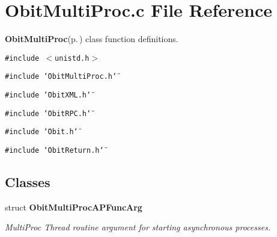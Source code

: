 \section{Obit\-Multi\-Proc.c File Reference}
\label{ObitMultiProc_8c}
{\bf Obit\-Multi\-Proc}{\rm (p.\,\pageref{structObitMultiProc})} class function definitions. 

{\tt \#include $<$unistd.h$>$}\par
{\tt \#include \char`\"{}Obit\-Multi\-Proc.h\char`\"{}}\par
{\tt \#include \char`\"{}Obit\-XML.h\char`\"{}}\par
{\tt \#include \char`\"{}Obit\-RPC.h\char`\"{}}\par
{\tt \#include \char`\"{}Obit.h\char`\"{}}\par
{\tt \#include \char`\"{}Obit\-Return.h\char`\"{}}\par
\subsection*{Classes}
\begin{CompactItemize}
\item 
struct {\bf Obit\-Multi\-Proc\-APFunc\-Arg}
\begin{CompactList}\small\item\em Multi\-Proc Thread routine argument for starting asynchronous processes. \item\end{CompactList}\end{CompactItemize}
